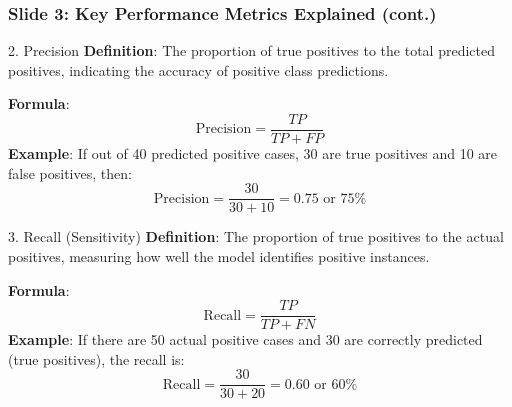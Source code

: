 \documentclass[aspectratio=169]{beamer}
\begin{document}
\begin{frame}[fragile]
    \frametitle{Slide 3: Key Performance Metrics Explained (cont.)}
    \begin{block}{2. Precision}
        \textbf{Definition}: The proportion of true positives to the total predicted positives, indicating the accuracy of positive class predictions.
        
        \textbf{Formula}:
        \begin{equation}
            \text{Precision} = \frac{TP}{TP + FP}
        \end{equation}
        \textbf{Example}: If out of 40 predicted positive cases, 30 are true positives and 10 are false positives, then:
        \begin{equation}
            \text{Precision} = \frac{30}{30 + 10} = 0.75 \text{ or } 75\%
        \end{equation}
    \end{block}

    \begin{block}{3. Recall (Sensitivity)}
        \textbf{Definition}: The proportion of true positives to the actual positives, measuring how well the model identifies positive instances.
        
        \textbf{Formula}:
        \begin{equation}
            \text{Recall} = \frac{TP}{TP + FN}
        \end{equation}
        \textbf{Example}: If there are 50 actual positive cases and 30 are correctly predicted (true positives), the recall is:
        \begin{equation}
            \text{Recall} = \frac{30}{30 + 20} = 0.60 \text{ or } 60\%
        \end{equation}
    \end{block}
\end{frame}
\end{document}
